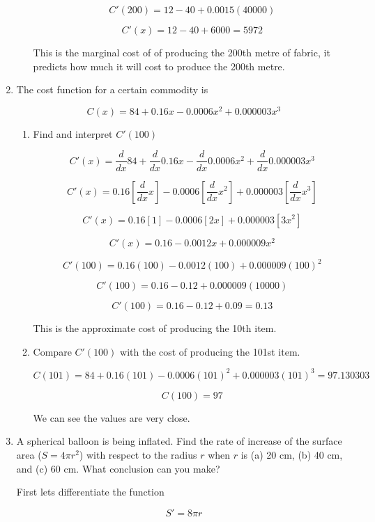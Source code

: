 \documentclass{article}
\begin{document}
\begin{enumerate}
\begin{enumerate}
					$$C'(200) = 12 - 40 + 0.0015(40000)$$

					$$C'(x) = 12 - 40 + 6000 = 5972$$

					This is the marginal cost of of producing the 200th metre of fabric, it 
					predicts how much it will cost to produce the 200th metre.
			\end{enumerate}

			\item The cost function for a certain commodity is

				$$C(x) = 84 + 0.16x - 0.0006x^2 + 0.000003x^3$$

				\begin{enumerate}
					\item Find and interpret $C'(100)$

					$$C'(x) = \frac{d}{dx} 84 + \frac{d}{dx} 0.16x - \frac{d}{dx} 0.0006x^2 + \frac{d}{dx} 0.000003x^3$$

					$$C'(x) = 0.16[\frac{d}{dx} x] - 0.0006[\frac{d}{dx} x^2] + 0.000003[\frac{d}{dx} x^3]$$

					$$C'(x) = 0.16[1] - 0.0006[2x] + 0.000003[3x^2]$$

					$$C'(x) = 0.16 - 0.0012x + 0.000009x^2$$

					$$C'(100) = 0.16(100) - 0.0012(100) + 0.000009(100)^2$$

					$$C'(100) = 0.16 - 0.12 + 0.000009(10000)$$

					$$C'(100) = 0.16 - 0.12 + 0.09 = 0.13$$

					This is the approximate cost of producing the 10th item.

					\item Compare $C'(100)$ with the cost of producing the 101st item.

					$$C(101) = 84 + 0.16(101) - 0.0006(101)^2 + 0.000003(101)^3 = 97.130303$$

					$$C(100) = 97$$

					We can see the values are very close.

				\end{enumerate}

				\item A spherical balloon is being inflated. Find the rate of increase of the surface
					area ($S=4\pi r^2$) with respect to the radius $r$ when $r$ is (a) 20 cm, (b)
					40 cm, and (c) 60 cm. What conclusion can you make?

					First lets differentiate the function

					$$S' = 8\pi r$$


\end{enumerate}
\end{document}
